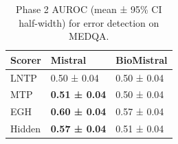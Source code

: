 \begin{table}
\caption{Phase 2 AUROC (mean ± 95\% CI half-width) for error detection on MEDQA.}
\label{tab:phase2_auroc_medqa}
\begin{tabular}{lll}
\toprule
Scorer & Mistral & BioMistral \\
\midrule
LNTP & 0.50 ± 0.04 & 0.50 ± 0.04 \\
MTP & \textbf{0.51 ± 0.04} & 0.50 ± 0.04 \\
EGH & \textbf{0.60 ± 0.04} & 0.57 ± 0.04 \\
Hidden & \textbf{0.57 ± 0.04} & 0.51 ± 0.04 \\
\bottomrule
\end{tabular}
\end{table}
